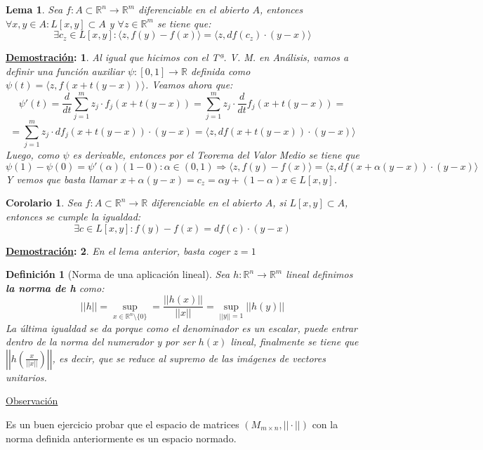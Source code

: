 \documentclass[10pt,a4paper,openright]{book}
\theoremstyle{break}
\newtheorem*{defi}{Definición}
\newtheorem*{coro}{Corolario}
\newtheorem*{lema}{Lema}
\newtheorem*{demo}{\underline{Demostración}:}
\begin{document}
\begin{lema}
Sea $f: A \subset \mathbb{R}^n \to \mathbb{R}^m$ diferenciable en el abierto $A$, entonces $\forall x,y \in A : L[x,y] \subset A$ y $\forall z \in \mathbb{R}^m$ se tiene que:
$$\exists c_z \in L [x,y] : \langle z, f(y) - f(x)\rangle = \langle z, df(c_z) \cdot (y-x) \rangle$$
\end{lema}
\begin{demo}
Al igual que hicimos con el Tª. V. M. en Análisis, vamos a definir una función auxiliar $\psi:[0,1] \to \mathbb{R}$ definida como $\psi(t) = \langle z, f(x+t(y-x)) \rangle$. Veamos ahora que:
$$\psi ' (t) = \frac{d}{dt}  \sum_{j=1}^{m} z_j \cdot f_j (x + t(y-x)) = \sum_{j=1}^{m} z_j \cdot \frac{d}{dt} f_j (x + t(y-x)) =$$
$$= \sum_{j=1}^{m} z_j \cdot d f_j (x + t(y-x)) \cdot (y-x)= \langle z, df(x + t(y-x)) \cdot (y-x) \rangle$$
Luego, como $\psi$ es derivable, entonces por el Teorema del Valor Medio se tiene que
$$\psi (1) - \psi (0) = \psi'(\alpha) (1-0) : \alpha \in (0,1)\Rightarrow \langle z, f(y) - f(x)\rangle = \langle z, df(x + \alpha (y-x)) \cdot(y-x) \rangle$$
Y vemos que basta llamar $x + \alpha (y-x) = c_z = \alpha y + (1 - \alpha ) x \in L[x,y]$.
\end{demo}


\begin{coro}
Sea $f: A \subset \mathbb{R}^n \to \mathbb{R}$ diferenciable en el abierto $A$, si $L[x,y] \subset A$, entonces se cumple la igualdad:
$$\exists c \in L[x,y] : f(y) - f(x) = df(c) \cdot (y-x)$$
\end{coro}
\begin{demo}
En el lema anterior, basta coger $z = 1$
\end{demo}

\begin{defi}[Norma de una aplicación lineal]
Sea $h: \mathbb{R}^n \to \mathbb{R}^m$ lineal definimos \textbf{la norma de h} como:
$$||h|| = \sup_{x \in \mathbb{R}^n \setminus \{0\}} = \frac{||h(x)||}{||x||} = \sup_{||y|| = 1} || h(y)|| $$
La última igualdad se da porque como el denominador es un escalar, puede entrar dentro de la norma del numerador y por ser $h(x)$ lineal, finalmente se tiene que $\left|\left|h\left(\frac{x}{||x||}\right)\right|\right|$, es decir, que se reduce al supremo de las imágenes de vectores unitarios.
\end{defi}

\underline{Observación}

Es un buen ejercicio probar que el espacio de matrices $(M_{m \times n}, || \cdot || ) $ con la norma definida anteriormente es un espacio normado.
\end{document}
